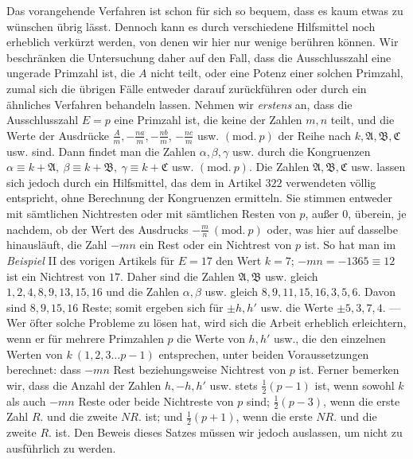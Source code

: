 Das vorangehende Verfahren ist schon für sich so bequem, dass es kaum etwas zu wünschen übrig lässt. Dennoch kann es durch verschiedene Hilfsmittel noch erheblich verkürzt werden, von denen wir hier nur wenige berühren können. Wir beschränken die Untersuchung daher auf den Fall, dass die Ausschlusszahl eine ungerade Primzahl ist, die \(A\) nicht teilt, oder eine Potenz einer solchen Primzahl, zumal sich die übrigen Fälle entweder darauf zurückführen oder durch ein ähnliches Verfahren behandeln lassen. Nehmen wir \textit{erstens} an, dass die Ausschlusszahl \(E=p\) eine Primzahl ist, die keine der Zahlen \(m,\allowbreak n\) teilt, und die Werte der Ausdrücke \(\frac Am,\allowbreak -\frac{na}m,\allowbreak -\frac{nb}m\), \(-\frac{nc}m\) usw. \((\mathrm{mod.}\ p)\) der Reihe nach \(k,\allowbreak \mathfrak A,\allowbreak \mathfrak B,\allowbreak \mathfrak C\) usw. sind. Dann findet man die Zahlen \(\alpha,\allowbreak \beta,\allowbreak \gamma\) usw. durch die Kongruenzen \(\alpha\equiv k+\mathfrak A,\allowbreak \ \beta\equiv k+\mathfrak B,\allowbreak \ \gamma\equiv k+\mathfrak C\) usw. \((\mathrm{mod.}\ p)\). Die Zahlen \(\mathfrak A,\allowbreak \mathfrak B,\allowbreak \mathfrak C\) usw. lassen sich jedoch durch ein Hilfsmittel, das dem in Artikel \(322\) verwendeten völlig entspricht, ohne Berechnung der Kongruenzen ermitteln. Sie stimmen entweder mit sämtlichen Nichtresten oder mit sämtlichen Resten von \(p\), außer \(0\), überein, je nachdem, ob der Wert des Ausdrucks \(-\frac mn\ (\mathrm{mod.}\ p)\) oder, was hier auf dasselbe hinausläuft, die Zahl \(-mn\) ein Rest oder ein Nichtrest von \(p\) ist. So hat man im \textit{Beispiel} II des vorigen Artikels für \(E=17\) den Wert \(k=7\); \(-mn=-1365\equiv12\) ist ein Nichtrest von \(17\). Daher sind die Zahlen \(\mathfrak A,\allowbreak \mathfrak B\) usw. gleich \(1,\allowbreak 2,\allowbreak 4,\allowbreak 8,\allowbreak 9,\allowbreak 13,\allowbreak 15,\allowbreak 16\) und die Zahlen \(\alpha,\allowbreak \beta\) usw. gleich \(8,\allowbreak 9,\allowbreak 11,\allowbreak 15,\allowbreak 16,\allowbreak 3,\allowbreak 5,\allowbreak 6\). Davon sind \(8,\allowbreak 9,\allowbreak 15,\allowbreak 16\) Reste; somit ergeben sich für \(\pm h,\allowbreak h'\) usw. die Werte \(\pm5,\allowbreak 3,\allowbreak 7,\allowbreak 4\). — Wer öfter solche Probleme zu lösen hat, wird sich die Arbeit erheblich erleichtern, wenn er für mehrere Primzahlen \(p\) die Werte von \(h,\allowbreak h'\) usw., die den einzelnen Werten von \(k\ (1,\allowbreak 2,\allowbreak 3\ldots p-1)\) entsprechen, unter beiden Voraussetzungen berechnet: dass \(-mn\) Rest beziehungsweise Nichtrest von \(p\) ist. Ferner bemerken wir, dass die Anzahl der Zahlen \(h,\allowbreak -h,\allowbreak h'\) usw. stets \(\frac12(p-1)\) ist, wenn sowohl \(k\) als auch \(-mn\) Reste oder beide Nichtreste von \(p\) sind; \(\frac12(p-3)\), wenn die erste Zahl \(R.\) und die zweite \(NR.\) ist; und \(\frac12(p+1)\), wenn die erste \(NR.\) und die zweite \(R.\) ist. Den Beweis dieses Satzes müssen wir jedoch auslassen, um nicht zu ausführlich zu werden.

